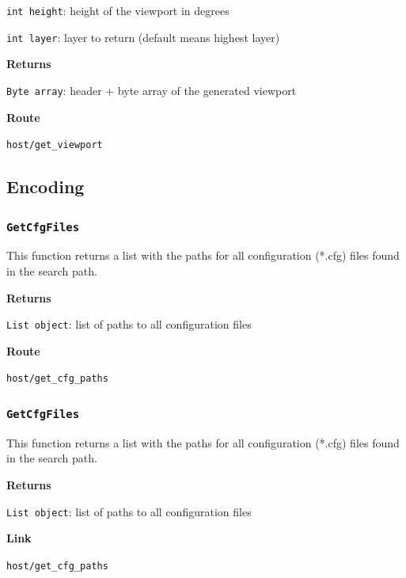 \documentclass{article}
\begin{document}
\texttt{int height}: height of the viewport in degrees

\texttt{int layer}: layer to return (default means highest layer)

\textbf{Returns}

\texttt{Byte array}: header + byte array of the generated viewport

\textbf{Route}

\texttt{host/get_viewport}





\subsection{Encoding}

\subsubsection*{\texttt{GetCfgFiles}}

This function returns a list with the paths for all configuration (*.cfg) files found in the search path.

\textbf{Returns}

\texttt{List object}: list of paths to all configuration files

\textbf{Route}

\texttt{host/get_cfg_paths}


\subsubsection*{\texttt{GetCfgFiles}}

This function returns a list with the paths for all configuration (*.cfg) files found in the search path.

\textbf{Returns}

\texttt{List object}: list of paths to all configuration files

\textbf{Link}

\texttt{host/get_cfg_paths}

\end{document}
